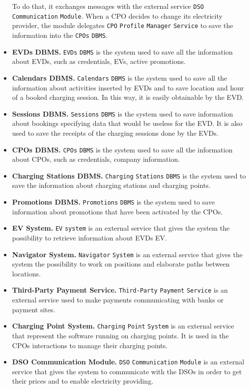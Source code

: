 \begin{itemize}
    To do that, it exchanges messages with the external service \verb|DSO| \verb|Communication| \verb|Module|.
    When a CPO decides to change its electricity provider, the module delegates \verb|CPO| \verb|Profile| \verb|Manager| \verb|Service| to
    save the information into the \verb|CPOs| \verb|DBMS|.
    \item \textbf{EVDs DBMS.} \verb|EVDs| \verb|DBMS| is the system used to save all the information about EVDs, such as
    credentials, EVs, active promotions.
    \item \textbf{Calendars DBMS.} \verb|Calendars| \verb|DBMS| is the system used to save all the information about activities
    inserted by EVDs and to save location and hour of a booked charging session.
    In this way, it is easily obtainable by the EVD\@.
    \item \textbf{Sessions DBMS.} \verb|Sessions| \verb|DBMS| is the system used to save information about bookings
    specifying data that would be useless for the EVD\@.
    It is also used to save the receipts of the charging sessions done by the EVDs.
    \item \textbf{CPOs DBMS.} \verb|CPOs| \verb|DBMS| is the system used to save all the information about CPOs, such as credentials,
    company information.
    \item \textbf{Charging Stations DBMS.} \verb|Charging| \verb|Stations| \verb|DBMS| is the system used to save the information about
    charging stations and charging points.
    \item \textbf{Promotions DBMS.} \verb|Promotions| \verb|DBMS| is the system used to save information about promotions
    that have been activated by the CPOs.
    \item \textbf{EV System.} \verb|EV| \verb|system| is an external service that gives the system the possibility to retrieve
    information about EVDs EV\@.
    \item \textbf{Navigator System.} \verb|Navigator| \verb|System| is an external service that gives the system the possibility
    to work on positions and elaborate paths between locations.
    \item \textbf{Third-Party Payment Service.} \verb|Third-Party| \verb|Payment| \verb|Service| is an external service used to
    make payments communicating with banks or payment sites.
    \item \textbf{Charging Point System.} \verb|Charging| \verb|Point| \verb|System| is an external service that represent the software
    running on charging points.
    It is used in the CPOs interactions to manage their charging points.
    \item \textbf{DSO Communication Module.} \verb|DSO| \verb|Communication| \verb|Module| is an external service that gives the system
    to communicate with the DSOs in order to get their prices and to enable electricity providing.
\end{itemize}

